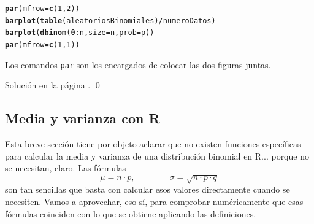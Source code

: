 \documentclass[10pt,a4paper]{article}\usepackage[]{graphicx}\usepackage[]{color}
\makeatletter
\newcommand{\hlnum}[1]{\textcolor[rgb]{0.686,0.059,0.569}{#1}}%
\newcommand{\hlopt}[1]{\textcolor[rgb]{0,0,0}{#1}}%
\newcommand{\hlstd}[1]{\textcolor[rgb]{0.345,0.345,0.345}{#1}}%
\newcommand{\hlkwc}[1]{\textcolor[rgb]{0.333,0.667,0.333}{#1}}%
\newcommand{\hlkwd}[1]{\textcolor[rgb]{0.737,0.353,0.396}{\textbf{#1}}}%
\newenvironment{kframe}{%
 \def\at@end@of@kframe{}%
 \ifinner\ifhmode%
  \def\at@end@of@kframe{\end{minipage}}%
  \begin{minipage}{\columnwidth}%
 \fi\fi%
 \def\FrameCommand##1{\hskip\@totalleftmargin \hskip-\fboxsep
 \colorbox{shadecolor}{##1}\hskip-\fboxsep
     \hskip-\linewidth \hskip-\@totalleftmargin \hskip\columnwidth}%
 \MakeFramed {\advance\hsize-\width
   \@totalleftmargin\z@ \linewidth\hsize
   \@setminipage}}%
 {\par\unskip\endMakeFramed%
 \at@end@of@kframe}
\newenvironment{knitrout}{}{} %
\makeatother
\begin{document}
\begin{ejercicio}
\begin{enumerate}
\begin{knitrout}
\begin{kframe}
\begin{alltt}
\hlkwd{par}\hlstd{(}\hlkwc{mfrow}\hlstd{=}\hlkwd{c}\hlstd{(}\hlnum{1}\hlstd{,}\hlnum{2}\hlstd{))}
\hlkwd{barplot}\hlstd{(}\hlkwd{table}\hlstd{(aleatoriosBinomiales)}\hlopt{/}\hlstd{numeroDatos)}
\hlkwd{barplot}\hlstd{(}\hlkwd{dbinom}\hlstd{(}\hlnum{0}\hlopt{:}\hlstd{n,} \hlkwc{size}\hlstd{=n,} \hlkwc{prob}\hlstd{=p))}
\hlkwd{par}\hlstd{(}\hlkwc{mfrow}\hlstd{=}\hlkwd{c}\hlstd{(}\hlnum{1}\hlstd{,}\hlnum{1}\hlstd{))}
\end{alltt}
\end{kframe}
\end{knitrout}
        Los comandos {\tt par} son los encargados de colocar las dos figuras juntas.

\end{enumerate}
Solución en la página \pageref{tut05:ejercicio06:sol}.
\qed
\end{ejercicio}

\subsection{Media y varianza con R}
\label{tut05:subsec:MediaVarianzaBinomialConR}

Esta breve sección tiene por objeto aclarar que no existen funciones específicas para calcular la media y varianza de una distribución binomial en R... porque no se necesitan, claro. Las fórmulas
\[\mu=n\cdot p, \qquad\qquad\sigma = \sqrt{n\cdot p\cdot q}\]
son tan sencillas que basta con calcular esos valores directamente cuando se necesiten. Vamos a aprovechar, eso sí, para comprobar numéricamente que esas fórmulas coinciden con lo que se obtiene aplicando las definiciones.
\end{document}
